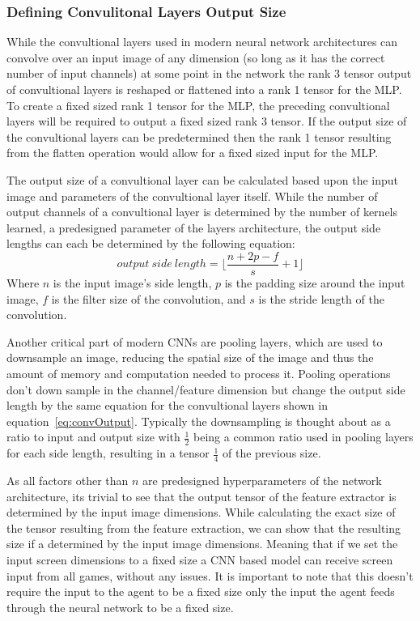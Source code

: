 \subsubsection{Defining Convulitonal Layers Output Size}
While the convultional layers used in modern neural network architectures can convolve over an input image of any dimension (so long as it has the correct number of input channels) at some point in the network the rank 3 tensor output of convultional layers is reshaped or flattened into a rank 1 tensor for the MLP.
To create a fixed sized rank 1 tensor for the MLP, the preceding convultional layers will be required to output a fixed sized rank 3 tensor.
If the output size of the convultional layers can be predetermined then the rank 1 tensor resulting from the flatten operation would allow for a fixed sized input for the MLP.
\par
The output size of a convultional layer can be calculated based upon the input image and parameters of the convultional layer itself.
While the number of output channels of a convultional layer is determined by the number of kernels learned, a predesigned parameter of the layers architecture, the output side lengths can each be determined by the following equation:
\begin{equation} \label{eq:convOutput}
    output\ side\ length = \lfloor \frac{n + 2p - f} {s} + 1 \rfloor
\end{equation}
Where $n$ is the input image's side length, $p$ is the padding size around the input image, $f$ is the filter size of the convolution, and $s$ is the stride length of the convolution.
\par
Another critical part of modern CNNs are pooling layers, which are used to downsample an image, reducing the spatial size of the image and thus the amount of memory and computation needed to process it.
Pooling operations don't down sample in the channel/feature dimension but change the output side length by the same equation for the convultional layers shown in equation~\ref{eq:convOutput}.
Typically the downsampling is thought about as a ratio to input and output size with $\frac{1}{2}$ being a common ratio used in pooling layers for each side length, resulting in a tensor $\frac{1}{4}$ of the previous size.
\par
As all factors other than $n$ are predesigned hyperparameters of the network architecture, its trivial to see that the output tensor of the feature extractor is determined by the input image dimensions.
While calculating the exact size of the tensor resulting from the feature extraction, we can show that the resulting size if a determined by the input image dimensions.
Meaning that if we set the input screen dimensions to a fixed size a CNN based model can receive screen input from all games, without any issues.
It is important to note that this doesn't require the input to the agent to be a fixed size only the input the agent feeds through the neural network to be a fixed size.

